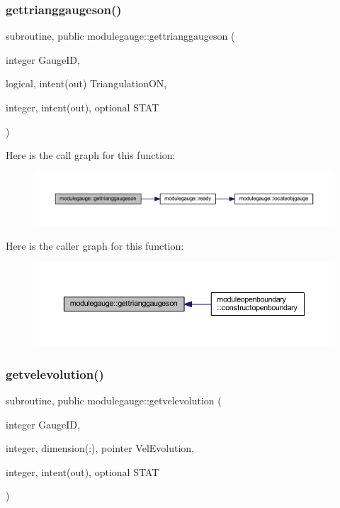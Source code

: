 \subsubsection{\texorpdfstring{gettrianggaugeson()}{gettrianggaugeson()}}
{\footnotesize\ttfamily subroutine, public modulegauge\+::gettrianggaugeson (\begin{DoxyParamCaption}\item[{integer}]{Gauge\+ID,  }\item[{logical, intent(out)}]{Triangulation\+ON,  }\item[{integer, intent(out), optional}]{S\+T\+AT }\end{DoxyParamCaption})}

Here is the call graph for this function\+:\nopagebreak
\begin{figure}[H]
\begin{center}
\leavevmode
\includegraphics[width=350pt]{namespacemodulegauge_a0912cebda10faa15469d951016b5db0e_cgraph}
\end{center}
\end{figure}
Here is the caller graph for this function\+:\nopagebreak
\begin{figure}[H]
\begin{center}
\leavevmode
\includegraphics[width=350pt]{namespacemodulegauge_a0912cebda10faa15469d951016b5db0e_icgraph}
\end{center}
\end{figure}
\mbox{\label{namespacemodulegauge_af4997d45043f601c961fd7d153c0b413}} 
\subsubsection{\texorpdfstring{getvelevolution()}{getvelevolution()}}
{\footnotesize\ttfamily subroutine, public modulegauge\+::getvelevolution (\begin{DoxyParamCaption}\item[{integer}]{Gauge\+ID,  }\item[{integer, dimension(\+:), pointer}]{Vel\+Evolution,  }\item[{integer, intent(out), optional}]{S\+T\+AT }\end{DoxyParamCaption})}

